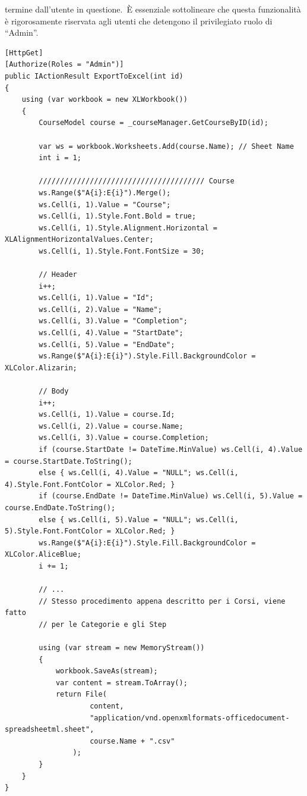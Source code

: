 termine dall'utente in questione.\ È essenziale sottolineare che questa funzionalità è rigorosamente riservata agli 
utenti che detengono il privilegiato ruolo di ``Admin''.
%
\begin{lstlisting}[style=cs_style, caption=funzione utilizzata per l'esportazione in file exel]
[HttpGet]
[Authorize(Roles = "Admin")]
public IActionResult ExportToExcel(int id)
{
	using (var workbook = new XLWorkbook())
	{
		CourseModel course = _courseManager.GetCourseByID(id);

		var ws = workbook.Worksheets.Add(course.Name); // Sheet Name
		int i = 1;

		/////////////////////////////////////// Course
		ws.Range($"A{i}:E{i}").Merge();
		ws.Cell(i, 1).Value = "Course";
		ws.Cell(i, 1).Style.Font.Bold = true;
		ws.Cell(i, 1).Style.Alignment.Horizontal = XLAlignmentHorizontalValues.Center;
		ws.Cell(i, 1).Style.Font.FontSize = 30;

		// Header
		i++;
		ws.Cell(i, 1).Value = "Id";
		ws.Cell(i, 2).Value = "Name";
		ws.Cell(i, 3).Value = "Completion";
		ws.Cell(i, 4).Value = "StartDate";
		ws.Cell(i, 5).Value = "EndDate";
		ws.Range($"A{i}:E{i}").Style.Fill.BackgroundColor = XLColor.Alizarin;

		// Body
		i++;
		ws.Cell(i, 1).Value = course.Id;
		ws.Cell(i, 2).Value = course.Name;
		ws.Cell(i, 3).Value = course.Completion;
		if (course.StartDate != DateTime.MinValue) ws.Cell(i, 4).Value = course.StartDate.ToString();
		else { ws.Cell(i, 4).Value = "NULL"; ws.Cell(i, 4).Style.Font.FontColor = XLColor.Red; }
		if (course.EndDate != DateTime.MinValue) ws.Cell(i, 5).Value = course.EndDate.ToString();
		else { ws.Cell(i, 5).Value = "NULL"; ws.Cell(i, 5).Style.Font.FontColor = XLColor.Red; }
		ws.Range($"A{i}:E{i}").Style.Fill.BackgroundColor = XLColor.AliceBlue;
		i += 1;

		// ...
		// Stesso procedimento appena descritto per i Corsi, viene fatto
		// per le Categorie e gli Step 
		
		using (var stream = new MemoryStream())
		{
			workbook.SaveAs(stream);
			var content = stream.ToArray();
			return File(
					content,
					"application/vnd.openxmlformats-officedocument-spreadsheetml.sheet",
					course.Name + ".csv"
				);
		}
	}
}
\end{lstlisting}

